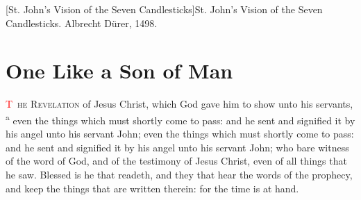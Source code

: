 [St. John's Vision of the Seven Candlesticks]{St. John's Vision of the Seven Candlesticks. Albrecht Dürer, 1498.}

\pagestyle{fancy}
\mainmatter
\trimFrame
\chapter{One Like a Son of Man}
\begingroup
\let\clearpage\relax
\endgroup
\lettrine[lines=3,nindent=-0.3em,loversize=0.05]{\textcolor{red}{T}}{\ he Revelation} of Jesus Christ, which God gave him to show unto his servants,%
		\textsuperscript{a}%
even the things which must shortly come to pass: and he sent and signified it by his angel unto his servant John; %
 even the things which must shortly come to pass: and he sent and signified it by his angel unto his servant John; %
who bare witness of the word of God, and of the testimony of Jesus Christ, even of all things that he saw. %
Blessed is he that readeth, and they that hear the words of the prophecy, and keep the things that are written therein: for the time is at hand.
